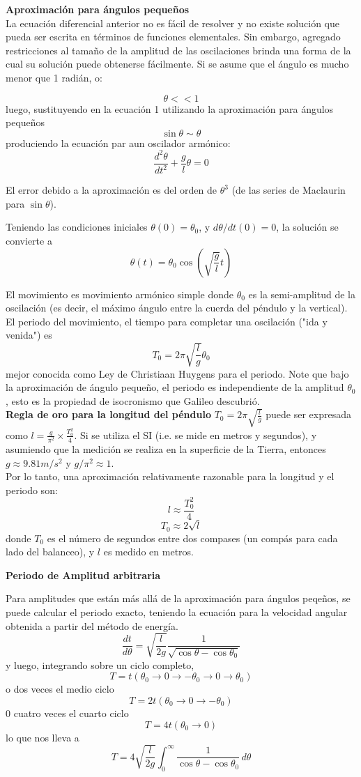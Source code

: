 \documentclass[12pt]{article}
\begin{document}
\textbf{Aproximación para ángulos pequeños}\\

La ecuación diferencial anterior no es fácil de resolver y no existe solución que pueda ser escrita en términos de funciones elementales.  Sin embargo, agregado restricciones al tamaño de la amplitud de las oscilaciones brinda una forma de la cual su solución puede obtenerse fácilmente. Si se asume que el ángulo es mucho menor que 1 radián, o:

$$\theta<<1$$
luego, sustituyendo en la ecuación 1 utilizando la aproximación para ángulos pequeños
$$\sin \theta \sim \theta$$
produciendo la ecuación par aun oscilador armónico:
$$\frac{d^2\theta}{dt^2}+\frac{g}{l}\theta=0$$

El error debido a la aproximación es del orden de $\theta^3$ (de las series de Maclaurin para $\sin\theta$).

Teniendo las condiciones iniciales $\theta(0)=\theta_0$, y $d\theta/dt(0)=0$, la solución se convierte a
$$\theta(t)=\theta_0\cos\left (\sqrt{\frac{g}{l}}t\right)$$

El movimiento es movimiento armónico simple donde $\theta_0$ es la semi-amplitud de la oscilación (es decir, el máximo ángulo entre la cuerda del péndulo y la vertical). El periodo del movimiento, el tiempo para completar una oscilación ("ida y venida") es
$$T_0=2\pi\sqrt{\frac{l}{g}}\theta_0$$
mejor conocida como Ley de Christiaan Huygens para el periodo. Note que bajo la aproximación de ángulo pequeño, el periodo es independiente de la amplitud $\theta_0$, esto es la propiedad de isocronismo que Galileo descubrió.\\

\textbf{Regla de oro para la longitud del péndulo}
$T_0=2\pi\sqrt{\frac{l}{g}}$ puede ser expresada como $l=\frac{g}{\pi^2}\times\frac{T_0^2}{4}$.
Si se utiliza el SI (i.e. se mide en metros y segundos), y asumiendo que la medición se realiza en la superficie de la Tierra, entonces $g\approx 9.81 m/s^2$ y $g/\pi^2\approx 1$.\\

Por lo tanto, una aproximación relativamente razonable para la longitud y el periodo son:
$$l\approx \frac{T_0^2}{4}$$
$$T_0 \approx 2\sqrt{l}$$
donde $T_0$ es el número de segundos entre dos compases (un compás para cada lado del balanceo), y $l$ es medido en metros.

\textbf{Periodo de Amplitud arbitraria}

Para amplitudes que están más allá de la aproximación para ángulos peqeños, se puede calcular el periodo exacto, teniendo la ecuación para la velocidad angular obtenida a partir del método de energía.
$$\frac{dt}{d\theta}=\sqrt{\frac{l}{2g}}\frac{1}{\sqrt{\cos\theta-\cos\theta_0}}$$
y luego, integrando sobre un ciclo completo,
$$T=t(\theta_0\rightarrow 0 \rightarrow -\theta_0 \rightarrow 0 \rightarrow \theta_0)$$
o dos veces el medio ciclo
$$T=2t(\theta_0 \rightarrow 0 \rightarrow -\theta_0)$$
0 cuatro veces el cuarto ciclo
$$T=4t(\theta_0 \rightarrow 0)$$
lo que nos lleva a
$$T=4\sqrt{\frac{l}{2g}}\int_{0}^{\infty} \! \frac{1}{\cos\theta-\cos\theta_0}\,d\theta$$
\end{document}
